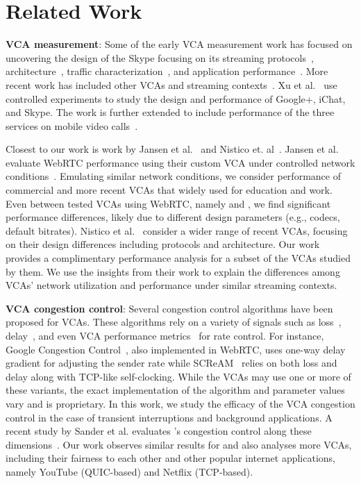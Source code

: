 \section{Related Work}\label{sec:related}

\textbf{VCA measurement}: Some of the early VCA measurement work has focused on uncovering the design of the Skype focusing on its streaming protocols~\cite{baset2004analysis}, architecture~\cite{guha2005experimental}, traffic characterization~\cite{bonfiglio2008tracking}, and application performance~\cite{hossfeld2008analysis}. More recent work has included other VCAs and streaming contexts~\cite{xu2012video, yu2014can, azfar2016android}. Xu et al.~\cite{xu2012video} use controlled experiments to study the design and performance of Google+, iChat, and Skype. The work is further extended to include performance of the three services on mobile video calls~\cite{yu2014can}. 

Closest to our work is work by Jansen et al.~\cite{jansen2018performance} and Nistico et. al~\cite{nistico2020comparative}. Jansen et al. evaluate WebRTC performance using their custom VCA under controlled network conditions~\cite{jansen2018performance}. Emulating similar network conditions, we consider performance of commercial and more recent VCAs that widely used for education and work. Even between tested VCAs using WebRTC, namely \meet and \teamsbrowser, we find significant performance differences, likely due to different design parameters (e.g., codecs, default bitrates). Nistico et al.~\cite{nistico2020comparative} consider a wider range of recent VCAs, focusing on their design differences including protocols and architecture. Our work provides a complimentary performance analysis for a subset of the VCAs studied by them. We use the insights from their work to explain the differences among VCAs' network utilization and performance under similar streaming contexts. 

\textbf{VCA congestion control}: Several congestion control algorithms have been proposed for VCAs. These algorithms rely on a variety of signals such as loss~\cite{handley2003tcp}, delay~\cite{carlucci2016analysis}, and even VCA performance metrics~\cite{singh2012rate} for rate control. For instance, Google Congestion Control~\cite{carlucci2016analysis}, also implemented in WebRTC, uses one-way delay gradient for adjusting the sender rate while SCReAM~\cite{johansson2015self} relies on both loss and delay along with TCP-like self-clocking. %
While the VCAs may use one or more of these variants, the exact implementation of the algorithm and parameter values vary and is proprietary. In this work, we study the efficacy of the VCA congestion control in the case of transient interruptions and background applications. A recent study by Sander et al. evaluates \zoom's congestion control along these dimensions~\cite{sandervideo}. Our work observes similar results for \zoom and also analyses more VCAs, including their fairness to each other and other popular internet applications, namely YouTube (QUIC-based) and Netflix (TCP-based). 


